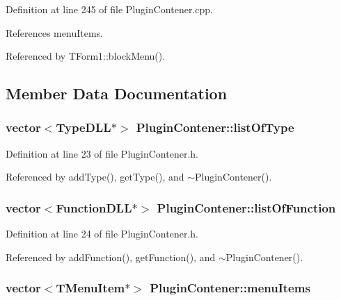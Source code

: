 Definition at line 245 of file PluginContener.cpp.

References menuItems.

Referenced by TForm1::blockMenu().

\subsection{Member Data Documentation}
\hypertarget{classPluginContener_a075645708492a1517095a6906321ee6}{
\subsubsection[listOfType]{\setlength{\rightskip}{0pt plus 5cm}vector$<${\bf TypeDLL}$\ast$$>$ {\bf PluginContener::listOfType}}}
\label{classPluginContener_a075645708492a1517095a6906321ee6}




Definition at line 23 of file PluginContener.h.

Referenced by addType(), getType(), and $\sim$PluginContener().\hypertarget{classPluginContener_6e6397c16d1ec7bb6beff37edebb5a8f}{
\subsubsection[listOfFunction]{\setlength{\rightskip}{0pt plus 5cm}vector$<${\bf FunctionDLL}$\ast$$>$ {\bf PluginContener::listOfFunction}}}
\label{classPluginContener_6e6397c16d1ec7bb6beff37edebb5a8f}




Definition at line 24 of file PluginContener.h.

Referenced by addFunction(), getFunction(), and $\sim$PluginContener().\hypertarget{classPluginContener_98824bc6704781e23fa586436e51a5bb}{
\subsubsection[menuItems]{\setlength{\rightskip}{0pt plus 5cm}vector$<$TMenuItem$\ast$$>$ {\bf PluginContener::menuItems}}}
\label{classPluginContener_98824bc6704781e23fa586436e51a5bb}




